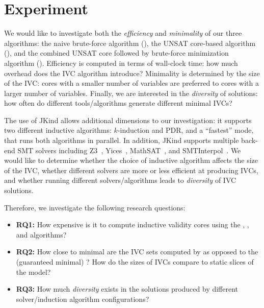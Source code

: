 \section{Experiment}
\label{sec:experiment}


We would like to investigate both the {\em efficiency} and {\em
  minimality} of our three algorithms: the naive brute-force
algorithm (\bfalg), the UNSAT core-based algorithm (\ucalg), and the
combined UNSAT core followed by brute-force minimization algorithm
(\ucbfalg). Efficiency is computed in terms of wall-clock time: how
much overhead does the IVC algorithm introduce? Minimality is
determined by the size of the IVC: cores with a smaller number of
variables are preferred to cores with a larger number of variables.
Finally, we are interested in the {\em diversity} of solutions: how
often do different tools/algorithms generate different minimal IVCs?

The use of JKind allows additional dimensions to our investigation: it supports two different inductive algorithms: $k$-induction and PDR, and a ``fastest'' mode, that runs both algorithms in parallel.  In addition, JKind supports multiple back-end SMT solvers including Z3~\cite{DeMoura08:z3}, Yices~\cite{Dutertre06:yices}, MathSAT~\cite{Cimatti2013:MathSAT}, and SMTInterpol~\cite{Christ2012:SMTInterpol}.  We would like to determine whether the choice of inductive algorithm affects the size of the IVC, whether different solvers are more or less efficient at producing IVCs, and whether running different solvers/algorithms leads to {\em diversity} of IVC solutions.

Therefore, we investigate the following research questions:
\begin{itemize}
    \item \textbf{RQ1:} How expensive is it to compute inductive validity cores using the \bfalg, \ucalg, and \ucbfalg algorithms?
    \item \textbf{RQ2:} How close to minimal are the IVC sets computed by \ucalg as opposed to the (guaranteed minimal) \ucbfalg?  How do the sizes of IVCs compare to static slices of the model?
    \item \textbf{RQ3:} How much {\em diversity} exists in the solutions produced by different solver/induction algorithm configurations?
\end{itemize}


